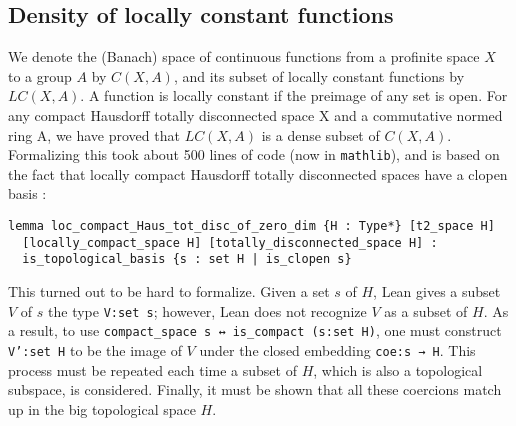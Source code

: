 \documentclass[a4paper,UKenglish,cleveref, autoref, thm-restate]{lipics-v2021}
\newcommand{\lean}[1]{\texttt{#1}\xspace} %
\begin{document}
\subsection{Density of locally constant functions}
We denote the (Banach) space of continuous functions from a profinite space $X$ to a group $A$ by $C(X, A)$, 
and its subset of locally constant functions by $LC(X, A)$. A function is locally constant if the preimage of any set is open. 
For any compact Hausdorff totally disconnected space X and a commutative
normed ring A, we have proved that $LC(X, A)$ is a dense subset of $C(X, A)$. 
Formalizing this took about 500 lines of code (now in \lean{mathlib}), and is based on the fact that locally compact Hausdorff
totally disconnected spaces have a clopen basis :
\begin{lstlisting}
lemma loc_compact_Haus_tot_disc_of_zero_dim {H : Type*} [t2_space H] 
  [locally_compact_space H] [totally_disconnected_space H] : 
  is_topological_basis {s : set H | is_clopen s}
\end{lstlisting}
This turned out to be hard to formalize. Given a set $s$ of $H$, Lean gives a subset $V$ of $s$ 
the type \lean{V:set s}; however, Lean does not recognize $V$ as a subset of $H$. As a result, 
to use \lean{compact\_space s ↔ is\_compact (s:set H)}, one must construct \lean{V':set H} 
to be the image of $V$ under the closed embedding \lean{coe:s → H}. This process must be repeated each time a subset of $H$, 
which is also a topological subspace, is considered. Finally, it must be shown that all these coercions match up in the big 
topological space $H$.
\end{document}
